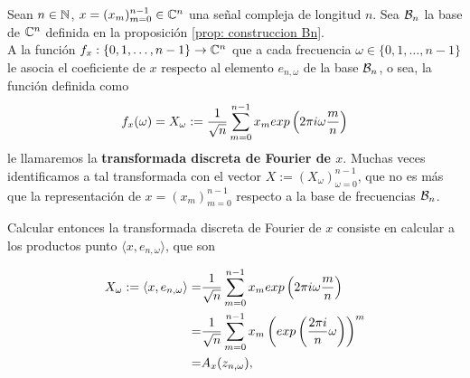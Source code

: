 \begin{defi}
Sean $n \in \mathbb{N}$, $x = (x_{m})_{m=0}^{n-1} \in \mathbb{C}^{n}$
una señal compleja de longitud $n$.
Sea $\mathcal{B}_{n}$ la base de $\mathbb{C}^{n}$ definida en 
la proposición \ref{prop: construccion Bn}. \\

A la función $f_{x}: \{ 0, 1, \ldots, n-1 \} 
\rightarrow \mathbb{C}^{n}$ que a cada
frecuencia $\omega \in \{ 0, 1, \ldots, n-1 \} $
le asocia el coeficiente de $x$ respecto 
al elemento $e_{n, \omega}$ de la base
$\mathcal{B}_{n}$, o sea, la función definida como
\begin{equation}
\label{eq: TDF}
f_{x}(\omega) = X_{\omega} := 
\frac{1}{\sqrt{n}} \sum\limits_{m=0}^{n-1}x_{m} exp \left(
2 \pi i \omega \frac{m}{n}
\right)
\end{equation}
le llamaremos la 
\textbf{transformada discreta de Fourier de $x$}.
Muchas veces identificamos a tal transformada
con el vector
$X := (X_{\omega})_{\omega = 0}^{n-1}$, que 
no es más que la representación 
de $x = (x_{m})_{m=0}^{n-1}$ respecto a la 
base de frecuencias $\mathcal{B}_{n}$.
\end{defi}



\begin{comment}
{\Huge{\textcolor{red}{TDF}}} 

{\Huge{\textcolor{red}{Dominio: tiempo}}} 


{\Huge{\textcolor{red}{Dominio: frecuencia}}}

{\Huge{ $x = (x_{m})_{0 \leq m \leq n-1}$ }}

{\Huge{ $\langle x, e_{\omega} \rangle$, $0 \leq \omega \leq n-1 $ }}

\end{comment}

Calcular entonces la transformada discreta de Fourier
de $x$ consiste en calcular a los productos
punto $\langle x, e_{n,\omega} \rangle $, que son

\begin{align*}
X_{\omega} := \langle x, e_{n,\omega} \rangle = & 
\frac{1}{\sqrt{n}} \sum\limits_{m=0}^{n-1}x_{m} exp \left(
2 \pi i \omega \frac{m}{n}
\right) \\
= & 
\frac{1}{\sqrt{n}} \sum\limits_{m=0}^{n-1}x_{m} 
\left(
exp \left( \frac{2 \pi i }{n} \omega
\right) \right)^{m} \\
= & A_{x}(z_{n, \omega}),
\end{align*}


